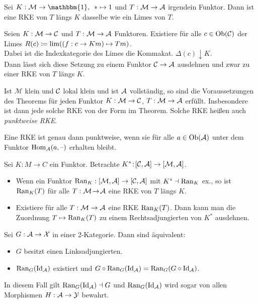 \documentclass{cheat-sheet}
\newcommand{\ModC}{\mathcal{M}} %
\newcommand{\UnitOb}{\mathbbm{1}} %
\begin{document}
\begin{bsp}
  Sei $K : \ModC \to \UnitOb, \enspace * \mapsto 1$ und $T : \ModC \to \Aat$ irgendein Funktor. Dann ist eine RKE von $T$ längs $K$ dasselbe wie ein Limes von $T$.
\end{bsp}

\begin{thm}
  Seien $K : \ModC \to \Cat$ und $T : \ModC \to \Aat$ Funktoren.
  Existiere für alle $c \in \operatorname{Ob}(\mathcal{C})$ der Limes
  $R(c) \coloneqq \lim ((f : c \to Km) \mapsto Tm)$. \\
  Dabei ist die Indexkategorie des Limes die Kommakat. $\Delta(c) \downarrow K$. \\
  Dann lässt sich diese Setzung zu einem Funktor $\mathcal{C} \to \mathcal{A}$ ausdehnen und zwar zu einer RKE von $T$ längs $K$.
\end{thm}

\begin{bem}
  Ist $\ModC$ klein und $\mathcal{C}$ lokal klein und ist $\mathcal{A}$ vollständig, so sind die Voraussetzungen des Theorems für jeden Funktor $K : \ModC \to \Cat$, $T : \ModC \to \Aat$ erfüllt. Insbesondere ist dann jede solche RKE von der Form im Theorem. Solche RKE heißen auch \emph{punktweise RKE}.
\end{bem}

\begin{lem}
  Eine RKE ist genau dann punktweise, wenn sie für alle $a \in \operatorname{Ob}(\mathcal{A})$ unter dem Funktor $\operatorname{Hom}_{\mathcal{A}}(a, \text{--})$ erhalten bleibt.
\end{lem}

\begin{thm}
  Sei $K \!:\! M \to C$ ein Funktor. Betrachte $K^* \!:\! [\Cat, \Aat] \to [\ModC, \Aat]$.
  \begin{itemize}
    \item Wenn ein Funktor $\Ran_K : [\ModC,\Aat] \to [\Cat, \Aat]$ mit $K^* \dashv \operatorname{Ran}_K$ ex., so ist $\operatorname{Ran}_K(T)$ für alle $T : \ModC \!\to\! \Aat$ eine RKE von $T$ längs $K$.
    \item Existiere für alle $T : \ModC \to \Aat$ eine RKE $\operatorname{Ran}_K(T)$. Dann kann man die Zuordnung $T \mapsto \operatorname{Ran}_K(T)$ zu einem Rechtsadjungierten von $K^*$ ausdehnen.
  \end{itemize}
\end{thm}

\begin{thm}
  Sei $G : \mathcal{A} \to \mathcal{X}$ in einer 2-Kategorie. Dann sind äquivalent:
  \begin{itemize}
    \item $G$ besitzt einen Linksadjungierten.
    \item $\operatorname{Ran}_G(\operatorname{Id}_{\mathcal{A}})$ existiert und $G \circ \operatorname{Ran}_G(\operatorname{Id}_{\mathcal{A}}) = \operatorname{Ran}_G(G \circ \operatorname{Id}_{\mathcal{A}})$.
  \end{itemize}
  In diesem Fall gilt $\operatorname{Ran}_G(\operatorname{Id}_{\mathcal{A}}) \dashv G$ und $\operatorname{Ran}_G(\operatorname{Id}_{\mathcal{A}})$ wird sogar von allen Morphismen $H : \mathcal{A} \to \mathcal{Y}$ bewahrt.
\end{thm}
\end{document}
